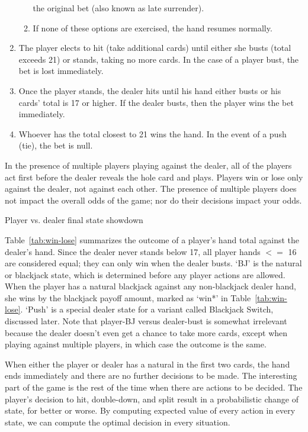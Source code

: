 \begin{enumerate}
\begin{enumerate}
the original bet (also known as late surrender).
\item If none of these options are exercised, the hand resumes normally.
\end{enumerate}
\item The player elects to hit (take additional cards) until either
she busts (total exceeds 21) or stands, taking no more cards.
In the case of a player bust, the bet is lost immediately.
\item Once the player stands, the dealer hits until his hand either busts
or his cards' total is 17 or higher.  
If the dealer busts, then the player wins the bet immediately.  
\item Whoever has the total closest to 21 wins the hand.
In the event of a push (tie), the bet is null.
\end{enumerate}


In the presence of multiple players playing against the dealer, 
all of the players act first before the dealer reveals the hole card
and plays.  
Players win or lose only against the dealer, not against each other.
The presence of multiple players does not impact the overall 
odds of the game; nor do their decisions impact your odds.

\begin{table}[ht!]
\caption{Player vs. dealer final state showdown}
\begin{center}

\end{center}
\label{tab:win-lose}
\end{table}

Table~\ref{tab:win-lose} summarizes the outcome of a player's hand total
against the dealer's hand.
Since the dealer never stands below 17, all player hands $<=$ 16
are considered equal; they can only win when the dealer busts.
`BJ' is the natural or blackjack state, which is determined 
before any player actions are allowed.
When the player has a natural blackjack against any non-blackjack 
dealer hand, she wins by the blackjack payoff amount, marked as `win*'
in Table~\ref{tab:win-lose}.  
`Push' is a special dealer state for a variant called Blackjack Switch, 
discussed later.
Note that player-BJ versus dealer-bust is somewhat irrelevant because
the dealer doesn't even get a chance to take more cards, 
except when playing against multiple players, 
in which case the outcome is the same.  

When either the player or dealer has a natural
in the first two cards, the hand ends immediately
and there are no further decisions to be made.
The interesting part of the game is the rest of the time when
there are actions to be decided.
The player's decision to hit, double-down, and split
result in a probabilistic change of state, for better or worse.
By computing expected value of every action
in every state, we can compute the optimal decision in every situation.  

